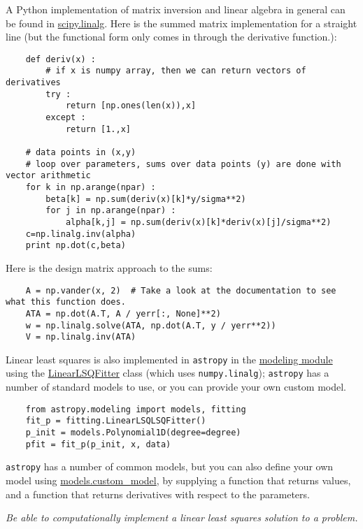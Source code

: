 \documentclass{article}
\newcommand{\test}[1]{%
    \begin{center}
        \colorbox{hl}{\parbox{0.9\textwidth}{\emph{\centering #1}}}
    \end{center}}
\begin{document}
A Python implementation of matrix inversion and linear algebra in general
can be found in
\href{http://docs.scipy.org/doc/scipy/reference/tutorial/linalg.html}
{scipy.linalg}.
Here is the summed matrix implementation for a straight line
(but the functional form only comes in through the derivative function.):
\begin{verbatim}
    def deriv(x) :
        # if x is numpy array, then we can return vectors of derivatives
        try :
            return [np.ones(len(x)),x]
        except :
            return [1.,x]

    # data points in (x,y)
    # loop over parameters, sums over data points (y) are done with vector arithmetic
    for k in np.arange(npar) :
        beta[k] = np.sum(deriv(x)[k]*y/sigma**2)
        for j in np.arange(npar) :
            alpha[k,j] = np.sum(deriv(x)[k]*deriv(x)[j]/sigma**2)
    c=np.linalg.inv(alpha)
    print np.dot(c,beta)
\end{verbatim}
Here is the design matrix approach to the sums:
\begin{verbatim}
    A = np.vander(x, 2)  # Take a look at the documentation to see what this function does.
    ATA = np.dot(A.T, A / yerr[:, None]**2)
    w = np.linalg.solve(ATA, np.dot(A.T, y / yerr**2))
    V = np.linalg.inv(ATA)
\end{verbatim}
Linear least squares is also implemented in \texttt{astropy} in the
\href{http://astropy.readthedocs.org/en/v1.0.6/modeling/index.html}
{modeling module} using the
\href{http://astropy.readthedocs.org/en/v1.0.6/api/astropy.modeling.fitting.LinearLSQFitter.html#astropy.modeling.fitting.LinearLSQFitter}
{LinearLSQFitter} class (which uses {\tt numpy.linalg});
{\tt astropy} has a number of standard models to use,
or you can provide your own custom model.
\begin{verbatim}
    from astropy.modeling import models, fitting
    fit_p = fitting.LinearLSQLSQFitter()
    p_init = models.Polynomial1D(degree=degree)
    pfit = fit_p(p_init, x, data)
\end{verbatim}

{\tt astropy} has a number of common models, but you can also define your own
model using
\href{http://astronomy.nmsu.edu/holtz/a575/ay575notes/astropy.readthedocs.org/en/v1.0.6/api/astropy.modeling.custom_model.html#astropy.modeling.custom_model}
{models.custom\_model}, by supplying a function that returns
values, and a function that returns derivatives with respect to the
parameters.

\test{Be able to computationally implement a linear least squares solution
to a problem.}
\end{document}
